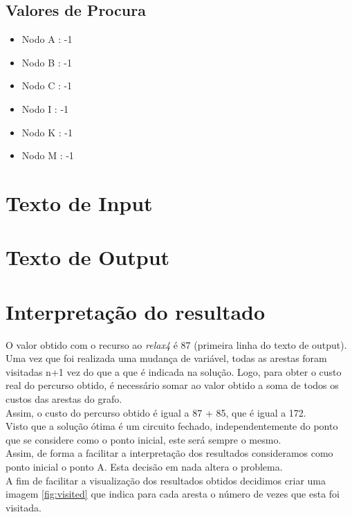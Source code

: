 \documentclass[a4paper]{report}
\begin{document}
\subsection{Valores de Procura}
\begin{itemize}
    \item Nodo A : -1
    \item Nodo B : -1
    \item Nodo C : -1
    \item Nodo I : -1
    \item Nodo K : -1
    \item Nodo M : -1
\end{itemize}

\pagebreak
\section{Texto de Input}
\label{input}


\pagebreak
\section{Texto de Output}
\label{input}


\pagebreak
\section{Interpretação do resultado}
\label{solution}
O valor obtido com o recurso ao \textit{relax4} é 87 (primeira linha do texto de
output). Uma vez que foi realizada uma mudança de variável, todas as arestas
foram visitadas n+1 vez do que a que é indicada na solução. Logo, para obter o
custo real do percurso obtido, é necessário somar ao valor obtido a soma de
todos os custos das arestas do grafo.\\
Assim, o custo do percurso obtido é igual a 87 + 85, que é igual a 172.\\
Visto que a solução ótima é um circuito fechado, independentemente do ponto
que se considere como o ponto inicial, este será sempre o mesmo. \\
Assim, de forma a facilitar a interpretação dos resultados consideramos como
ponto inicial o ponto A. Esta decisão em nada altera o problema.\\
A fim de facilitar a visualização dos resultados obtidos decidimos criar uma
imagem \ref{fig:visited} que indica para cada aresta o número de vezes que esta
foi visitada.
\end{document}
